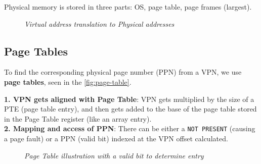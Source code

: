 \documentclass[11pt]{article}
\begin{document}
Physical memory is stored in three parts: OS, page table, page frames (largest).

\begin{figure}[htbp]
    \centering
    \caption{\textit{Virtual address translation to Physical addresses}}
\end{figure}

\subsection*{Page Tables}

To find the corresponding physical page number (PPN) from a VPN, we use \textbf{page tables}, seen in the \autoref{fig:page-table}.

\begin{tcolorbox}[
    enhanced,
    attach boxed title to top left={xshift=6mm,yshift=-1.5mm},
    colback=moonstoneblue!20,
    colframe=moonstoneblue,
    colbacktitle=moonstoneblue,
    title=Step by Step on Page Table Indexing,
    fonttitle=\bfseries\color{white},
    boxed title style={size=small,colframe=moonstoneblue,sharp corners},
    sharp corners,
    label=box:logic-types,
]
    {\color{moondark}\textbf{1. VPN gets aligned with Page Table}}: VPN gets multiplied by the size of a PTE (page table entry), and then gets added to the base of the page table stored in the Page Table register (like an array entry). \\
    {\color{moondark}\textbf{2. Mapping and access of PPN}}: There can be either a \texttt{NOT PRESENT} (causing a page fault) or a PPN (valid bit) indexed at the VPN offset calculated.
\end{tcolorbox}

\pagebreak

\begin{figure}[htbp]
    \centering
    \caption{\textit{Page Table illustration with a valid bit to determine entry}}
    \label{fig:page-table}
\end{figure}
\end{document}
